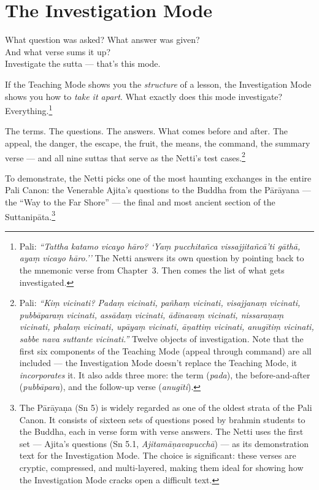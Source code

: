 \chapter{The Investigation Mode}
\label{ch:investigation}

\begin{versebox}
What question was asked? What answer was given?\\
And what verse sums it up?\\
Investigate the sutta --- that's this mode.
\end{versebox}

\noindent If the Teaching Mode shows you the \textit{structure} of a lesson, the Investigation Mode shows you how to \textit{take it apart}. What exactly does this mode investigate? Everything.\footnote{Pali: \textit{``Tattha katamo vicayo hāro? `Yaṃ pucchitañca vissajjitañcā'ti gāthā, ayaṃ vicayo hāro.''} The Netti answers its own question by pointing back to the mnemonic verse from Chapter~3. Then comes the list of what gets investigated.}

The terms. The questions. The answers. What comes before and after. The appeal, the danger, the escape, the fruit, the means, the command, the summary verse --- and all nine suttas that serve as the Netti's test cases.\footnote{Pali: \textit{``Kiṃ vicinati? Padaṃ vicinati, pañhaṃ vicinati, visajjanaṃ vicinati, pubbāparaṃ vicinati, assādaṃ vicinati, ādīnavaṃ vicinati, nissaraṇaṃ vicinati, phalaṃ vicinati, upāyaṃ vicinati, āṇattiṃ vicinati, anugītiṃ vicinati, sabbe nava suttante vicinati.''} Twelve objects of investigation. Note that the first six components of the Teaching Mode (appeal through command) are all included --- the Investigation Mode doesn't replace the Teaching Mode, it \textit{incorporates} it. It also adds three more: the term (\textit{pada}), the before-and-after (\textit{pubbāpara}), and the follow-up verse (\textit{anugīti}).}

To demonstrate, the Netti picks one of the most haunting exchanges in the entire Pali Canon: the Venerable Ajita's questions to the Buddha from the Pārāyana --- the ``Way to the Far Shore'' --- the final and most ancient section of the Suttanipāta.\footnote{The Pārāyaṇa (Sn 5) is widely regarded as one of the oldest strata of the Pali Canon. It consists of sixteen sets of questions posed by brahmin students to the Buddha, each in verse form with verse answers. The Netti uses the first set --- Ajita's questions (Sn 5.1, \textit{Ajitamāṇavapucchā}) --- as its demonstration text for the Investigation Mode. The choice is significant: these verses are cryptic, compressed, and multi-layered, making them ideal for showing how the Investigation Mode cracks open a difficult text.}


